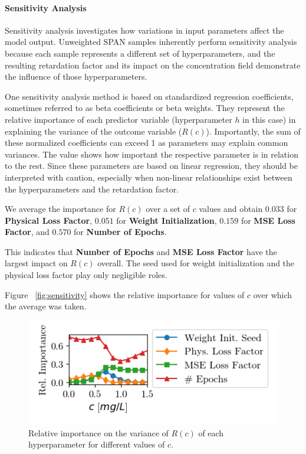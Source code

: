

\paragraph{Sensitivity Analysis}
\label{sec:sensitivity}
Sensitivity analysis investigates how variations in input parameters affect the model output. Unweighted SPAN samples inherently perform sensitivity analysis because each sample represents a different set of hyperparameters, and the resulting retardation factor and its impact on the concentration field demonstrate the influence of those hyperparameters.

One sensitivity analysis method is based on standardized regression coefficients, sometimes referred to as beta coefficients or beta weights. They represent the relative importance of each predictor variable (hyperparameter $h$ in this case) in explaining the variance of the outcome variable ($R(c)$).
Importantly, the sum of these normalized coefficients can exceed 1 as parameters may explain common variances. The value shows how important the respective parameter is in relation to the rest.
Since these parameters are based on linear regression, they should be interpreted with caution, especially when non-linear relationships exist between the hyperparameters and the retardation factor. %

We average the importance for $R(c)$ over a set of $c$ values and obtain $0.033$ for \textbf{Physical Loss Factor}, $0.051$ for \textbf{Weight Initialization}, $0.159$ for \textbf{MSE Loss Factor}, and $0.570$ for \textbf{Number of Epochs}.

This indicates that \textbf{Number of Epochs} and \textbf{MSE Loss Factor} have the largest impact on $R(c)$ overall. The seed used for weight initialization and the physical loss factor play only negligible roles.

Figure ~\vref{fig:sensitivity} shows the relative importance for values of $c$ over which the average was taken.

\begin{figure}[h]
    \centering
    \includegraphics{figs/sensitivity.png}
    \caption{Relative importance on the variance of $R(c)$ of each hyperparameter for different values of $c$.}
    \label{fig:sensitivity}
\end{figure}




